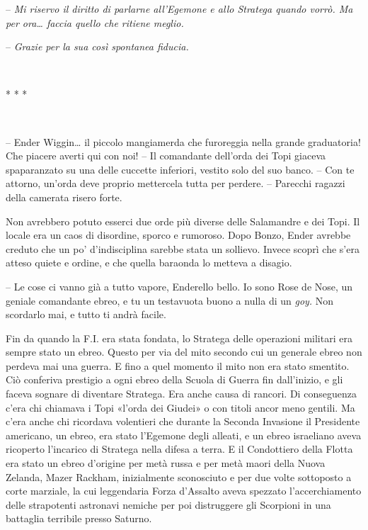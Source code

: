 {-- \emph{Mi riservo il diritto di parlarne all'Egemone e allo Stratega
		quando vorrò. Ma per ora\ldots{} faccia quello che ritiene meglio.}}

{-- \emph{Grazie per la sua così spontanea fiducia.}}

{~}

\begin{center}
	{* * *}
\end{center}

{~}

{-- Ender Wiggin\ldots{} il piccolo mangiamerda che furoreggia nella
	grande graduatoria! Che piacere averti qui con noi! -- Il comandante
	dell'orda dei Topi giaceva spaparanzato su una delle cuccette inferiori,
	vestito solo del suo banco. -- Con te attorno, un'orda deve proprio
	mettercela tutta per perdere. -- Parecchi ragazzi della camerata risero
	forte.}

{Non avrebbero potuto esserci due orde più diverse delle Salamandre e
	dei Topi. Il locale era un caos di disordine, sporco e rumoroso. Dopo
	Bonzo, Ender avrebbe creduto che un po' d'indisciplina sarebbe stata un
	sollievo. Invece scoprì che s'era atteso quiete e ordine, e che quella
	baraonda lo metteva a disagio.}

{-- Le cose ci vanno già a tutto vapore, Enderello bello. Io sono Rose
	de Nose, un geniale comandante ebreo, e tu un testavuota buono a nulla
	di un \emph{goy.} Non scordarlo mai, e tutto ti andrà facile.}

{Fin da quando la F.I. era stata fondata, lo Stratega delle operazioni
	militari era sempre stato un ebreo. Questo per via del mito secondo cui
	un generale ebreo non perdeva mai una guerra. E fino a quel momento il
	mito non era stato smentito. Ciò conferiva prestigio a ogni ebreo della
	Scuola di Guerra fin dall'inizio, e gli faceva sognare di diventare
	Stratega. Era anche causa di rancori. Di conseguenza c'era chi chiamava
	i Topi «l'orda dei Giudei» o con titoli ancor meno gentili. Ma c'era
	anche chi ricordava volentieri che durante la Seconda Invasione il
	Presidente americano, un ebreo, era stato l'Egemone degli alleati, e un
	ebreo israeliano aveva ricoperto l'incarico di Stratega nella difesa a
	terra. E il Condottiero della Flotta era stato un ebreo d'origine per
	metà russa e per metà maori della Nuova Zelanda, Mazer Rackham,
	inizialmente sconosciuto e per due volte sottoposto a corte marziale, la
	cui leggendaria Forza d'Assalto aveva spezzato l'accerchiamento delle
	strapotenti astronavi nemiche per poi distruggere gli Scorpioni in una
	battaglia terribile presso Saturno.}

